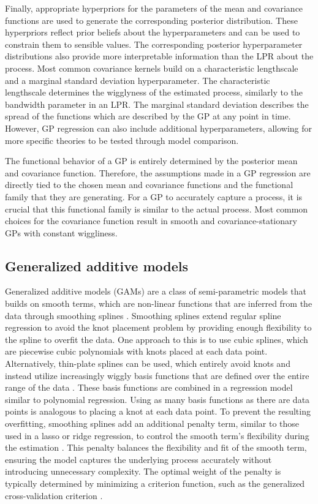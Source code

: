 \documentclass[man, floatsintext]{apa7}
\begin{document}
Finally, appropriate
hyperpriors for the parameters of the mean and covariance functions are used
to generate the corresponding posterior distribution. These hyperpriors reflect
prior beliefs about the hyperparameters and can be used to constrain them to
sensible values. The corresponding posterior hyperparameter distributions
also provide more interpretable information than the LPR about the process.
Most common covariance kernels build on a
characteristic lengthscale and a marginal standard deviation hyperparameter.
The characteristic lengthscale determines the wigglyness of the estimated
process, similarly to the bandwidth parameter in an LPR\@. The marginal
standard deviation describes the spread of the functions which are described
by the GP at any point in time. However, GP regression can also
include additional hyperparameters, allowing for more specific theories to be
tested through model comparison.

The functional behavior of a GP is entirely determined by the posterior mean
and covariance function. Therefore, the assumptions made in a GP regression
are directly tied to the chosen mean and covariance functions and the
functional family that they are generating. For a GP to accurately capture a
process, it is crucial that this functional family is similar to the actual
process. Most common choices for the covariance function result in smooth and
covariance-stationary GPs with constant wiggliness.

\subsection{Generalized additive models}

Generalized additive models (GAMs) are a class of semi-parametric models
that builds on smooth terms, which are
non-linear functions that are inferred from the data through smoothing splines
\parencite{wood_generalized_2006, wood_inference_2020,
  hastie_generalized_1999}. Smoothing splines extend regular spline regression
to avoid the knot placement problem by providing enough flexibility to the
spline to overfit the data. One approach to this is to use
cubic splines, which are piecewise cubic polynomials with knots placed at
each data point. Alternatively, thin-plate splines can be used, which entirely
avoid knots and instead utilize increasingly wiggly basis functions
that are defined over the entire range of the data \parencite{wood_thin_2003}.
These basis functions are combined in a regression model similar to polynomial
regression. Using as many basis functions as there are data points is analogous
to placing a knot at each data point.
To prevent the resulting overfitting, smoothing splines
add an additional penalty term, similar to those used in a
lasso or ridge regression, to control the smooth term's flexibility during
the estimation \parencite{gu_smoothing_2013, wahba_spline_1980}. This penalty
balances the
flexibility and fit of the smooth term, ensuring the model captures the
underlying process accurately without introducing unnecessary complexity. The
optimal weight of the penalty is typically determined by minimizing a criterion
function, such as the generalized cross-validation criterion
\parencite{wood_generalized_2006, golub_generalized_1997}.
\end{document}
